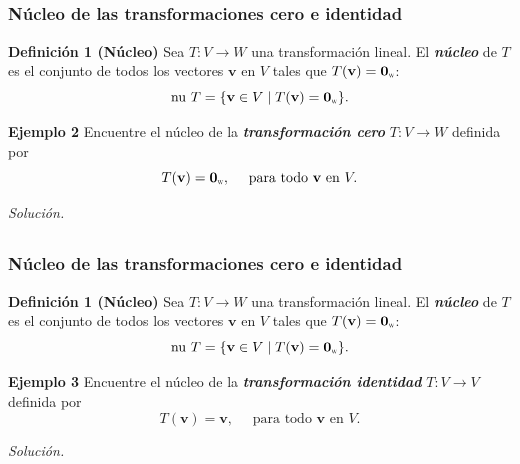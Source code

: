 
\subsection{}

\begin{frame}\frametitle{Núcleo de las transformaciones cero e identidad}
	
	\begin{block}{\textbf{Definición 1 (Núcleo)}}
		\justifying
		Sea $T:V\to W$ una transformación lineal. El \textbf{\textit{núcleo}} de $T$ es el conjunto de 
		todos los vectores $\mathbf{v}$ en $V$ tales que $T(\mathbf{v}) = \mathbf{0}_{\scalebox{0.4}{W}}$:
		\[
		\text{nu}\ T = \{ \mathbf{v}\in V \mid T(\mathbf{v}) = \mathbf{0}_{\scalebox{0.4}{W}} \}.
		\]
	\end{block}
	
	
	\begin{ej}{\textbf{Ejemplo 2}}
		\justifying
		Encuentre el núcleo de la \textbf{\textit{transformación cero}} $T:V\to W$ definida por
		\[
		T(\mathbf{v}) = \mathbf{0}_{\scalebox{0.4}{W}}, \quad \text{ para todo } \mathbf{v} \text{ en } V.
		\]
	\end{ej}
	\textit{Solución.}
	
\end{frame}


\subsection{}

\begin{frame}\frametitle{Núcleo de las transformaciones cero e identidad}
	
	\begin{block}{\textbf{Definición 1 (Núcleo)}}
		\justifying
		Sea $T:V\to W$ una transformación lineal. El \textbf{\textit{núcleo}} de $T$ es el conjunto de 
		todos los vectores $\mathbf{v}$ en $V$ tales que $T(\mathbf{v}) = \mathbf{0}_{\scalebox{0.4}{W}}$:
		\[
		\text{nu}\ T = \{ \mathbf{v}\in V \mid T(\mathbf{v}) = \mathbf{0}_{\scalebox{0.4}{W}} \}.
		\]
	\end{block}
		
	\begin{ej}{\textbf{Ejemplo 3}}
		\justifying
		Encuentre el núcleo de la \textbf{\textit{transformación identidad}} $T:V\to V$ definida por
		\[
		T(\mathbf{v}) = \mathbf{v}, \quad \text{ para todo } \mathbf{v} \text{ en } V.
		\]
	\end{ej}
	\textit{Solución.}
	
\end{frame}

